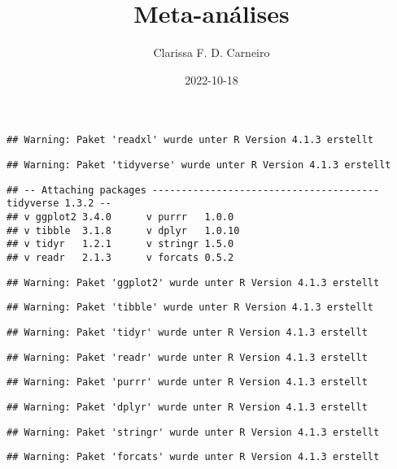 \documentclass[
]{article}
\title{Meta-análises}
\author{Clarissa F. D. Carneiro}
\date{2022-10-18}
\begin{document}
\maketitle

\begin{verbatim}
## Warning: Paket 'readxl' wurde unter R Version 4.1.3 erstellt
\end{verbatim}

\begin{verbatim}
## Warning: Paket 'tidyverse' wurde unter R Version 4.1.3 erstellt
\end{verbatim}

\begin{verbatim}
## -- Attaching packages --------------------------------------- tidyverse 1.3.2 --
## v ggplot2 3.4.0      v purrr   1.0.0 
## v tibble  3.1.8      v dplyr   1.0.10
## v tidyr   1.2.1      v stringr 1.5.0 
## v readr   2.1.3      v forcats 0.5.2
\end{verbatim}

\begin{verbatim}
## Warning: Paket 'ggplot2' wurde unter R Version 4.1.3 erstellt
\end{verbatim}

\begin{verbatim}
## Warning: Paket 'tibble' wurde unter R Version 4.1.3 erstellt
\end{verbatim}

\begin{verbatim}
## Warning: Paket 'tidyr' wurde unter R Version 4.1.3 erstellt
\end{verbatim}

\begin{verbatim}
## Warning: Paket 'readr' wurde unter R Version 4.1.3 erstellt
\end{verbatim}

\begin{verbatim}
## Warning: Paket 'purrr' wurde unter R Version 4.1.3 erstellt
\end{verbatim}

\begin{verbatim}
## Warning: Paket 'dplyr' wurde unter R Version 4.1.3 erstellt
\end{verbatim}

\begin{verbatim}
## Warning: Paket 'stringr' wurde unter R Version 4.1.3 erstellt
\end{verbatim}

\begin{verbatim}
## Warning: Paket 'forcats' wurde unter R Version 4.1.3 erstellt
\end{verbatim}
\end{document}
